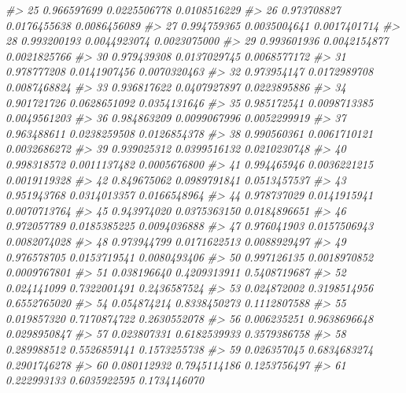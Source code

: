 \documentclass[
  oneside]{book}
\newenvironment{Shaded}{\begin{snugshade}}{\end{snugshade}}
\newcommand{\CommentTok}[1]{\textcolor[rgb]{0.56,0.35,0.01}{\textit{#1}}}
\begin{document}
\begin{Shaded}
\begin{Highlighting}[]
\CommentTok{\#\textgreater{} 25  0.966597699 0.0225506778 0.0108516229}
\CommentTok{\#\textgreater{} 26  0.973708827 0.0176455638 0.0086456089}
\CommentTok{\#\textgreater{} 27  0.994759365 0.0035004641 0.0017401714}
\CommentTok{\#\textgreater{} 28  0.993200193 0.0044923074 0.0023075000}
\CommentTok{\#\textgreater{} 29  0.993601936 0.0042154877 0.0021825766}
\CommentTok{\#\textgreater{} 30  0.979439308 0.0137029745 0.0068577172}
\CommentTok{\#\textgreater{} 31  0.978777208 0.0141907456 0.0070320463}
\CommentTok{\#\textgreater{} 32  0.973954147 0.0172989708 0.0087468824}
\CommentTok{\#\textgreater{} 33  0.936817622 0.0407927897 0.0223895886}
\CommentTok{\#\textgreater{} 34  0.901721726 0.0628651092 0.0354131646}
\CommentTok{\#\textgreater{} 35  0.985172541 0.0098713385 0.0049561203}
\CommentTok{\#\textgreater{} 36  0.984863209 0.0099067996 0.0052299919}
\CommentTok{\#\textgreater{} 37  0.963488611 0.0238259508 0.0126854378}
\CommentTok{\#\textgreater{} 38  0.990560361 0.0061710121 0.0032686272}
\CommentTok{\#\textgreater{} 39  0.939025312 0.0399516132 0.0210230748}
\CommentTok{\#\textgreater{} 40  0.998318572 0.0011137482 0.0005676800}
\CommentTok{\#\textgreater{} 41  0.994465946 0.0036221215 0.0019119328}
\CommentTok{\#\textgreater{} 42  0.849675062 0.0989791841 0.0513457537}
\CommentTok{\#\textgreater{} 43  0.951943768 0.0314013357 0.0166548964}
\CommentTok{\#\textgreater{} 44  0.978737029 0.0141915941 0.0070713764}
\CommentTok{\#\textgreater{} 45  0.943974020 0.0375363150 0.0184896651}
\CommentTok{\#\textgreater{} 46  0.972057789 0.0185385225 0.0094036888}
\CommentTok{\#\textgreater{} 47  0.976041903 0.0157506943 0.0082074028}
\CommentTok{\#\textgreater{} 48  0.973944799 0.0171622513 0.0088929497}
\CommentTok{\#\textgreater{} 49  0.976578705 0.0153719541 0.0080493406}
\CommentTok{\#\textgreater{} 50  0.997126135 0.0018970852 0.0009767801}
\CommentTok{\#\textgreater{} 51  0.038196640 0.4209313911 0.5408719687}
\CommentTok{\#\textgreater{} 52  0.024141099 0.7322001491 0.2436587524}
\CommentTok{\#\textgreater{} 53  0.024872002 0.3198514956 0.6552765020}
\CommentTok{\#\textgreater{} 54  0.054874214 0.8338450273 0.1112807588}
\CommentTok{\#\textgreater{} 55  0.019857320 0.7170874722 0.2630552078}
\CommentTok{\#\textgreater{} 56  0.006235251 0.9638696648 0.0298950847}
\CommentTok{\#\textgreater{} 57  0.023807331 0.6182539933 0.3579386758}
\CommentTok{\#\textgreater{} 58  0.289988512 0.5526859141 0.1573255738}
\CommentTok{\#\textgreater{} 59  0.026357045 0.6834683274 0.2901746278}
\CommentTok{\#\textgreater{} 60  0.080112932 0.7945114186 0.1253756497}
\CommentTok{\#\textgreater{} 61  0.222993133 0.6035922595 0.1734146070}

\end{Highlighting}
\end{Shaded}
\end{document}
